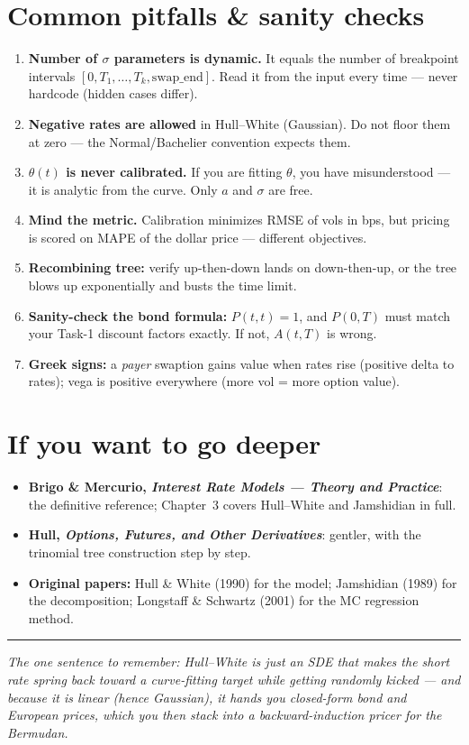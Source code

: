 \documentclass[11pt]{article}
\begin{document}
\section{Common pitfalls \& sanity checks}
\begin{enumerate}[leftmargin=1.6em]
  \item \textbf{Number of $\sigma$ parameters is dynamic.} It equals the number of
        breakpoint intervals $[0,T_1,\dots,T_k,\text{swap\_end}]$. Read it from the input
        every time --- never hardcode (hidden cases differ).
  \item \textbf{Negative rates are allowed} in Hull--White (Gaussian). Do not floor them
        at zero --- the Normal/Bachelier convention expects them.
  \item \textbf{$\theta(t)$ is never calibrated.} If you are fitting $\theta$, you have
        misunderstood --- it is analytic from the curve. Only $a$ and $\sigma$ are free.
  \item \textbf{Mind the metric.} Calibration minimizes RMSE of vols in bps, but pricing
        is scored on MAPE of the dollar price --- different objectives.
  \item \textbf{Recombining tree:} verify up-then-down lands on down-then-up, or the tree
        blows up exponentially and busts the time limit.
  \item \textbf{Sanity-check the bond formula:} $P(t,t)=1$, and $P(0,T)$ must match your
        Task-1 discount factors exactly. If not, $A(t,T)$ is wrong.
  \item \textbf{Greek signs:} a \emph{payer} swaption gains value when rates rise (positive
        delta to rates); vega is positive everywhere (more vol = more option value).
\end{enumerate}

\section{If you want to go deeper}
\begin{itemize}[leftmargin=1.4em]
  \item \textbf{Brigo \& Mercurio, \emph{Interest Rate Models --- Theory and Practice}}:
        the definitive reference; Chapter~3 covers Hull--White and Jamshidian in full.
  \item \textbf{Hull, \emph{Options, Futures, and Other Derivatives}}: gentler, with the
        trinomial tree construction step by step.
  \item \textbf{Original papers:} Hull \& White (1990) for the model; Jamshidian (1989)
        for the decomposition; Longstaff \& Schwartz (2001) for the MC regression method.
\end{itemize}

\vspace{1em}
\hrule
\vspace{0.8em}
\textit{The one sentence to remember: Hull--White is just an SDE that makes the short rate
spring back toward a curve-fitting target while getting randomly kicked --- and because
it is linear (hence Gaussian), it hands you closed-form bond and European prices, which
you then stack into a backward-induction pricer for the Bermudan.}
\end{document}
